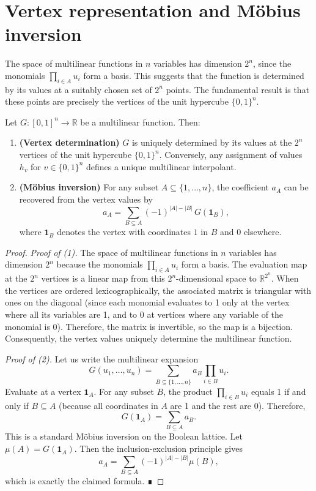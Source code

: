 \section{Vertex representation and Möbius inversion}
\label{sec:vertex-mobius}

The space of multilinear functions in \(n\) variables has dimension \(2^n\), since the monomials \(\prod_{i\in A} u_i\) form a basis. This suggests that the function is determined by its values at a suitably chosen set of \(2^n\) points. The fundamental result is that these points are precisely the vertices of the unit hypercube \(\{0,1\}^n\).

\begin{theorem}
\label{thm:vertex-mobius}
Let \(G:[0,1]^n\to\mathbb{R}\) be a multilinear function. Then:

\begin{enumerate}
    \item \textbf{(Vertex determination)} \(G\) is uniquely determined by its values at the \(2^n\) vertices of the unit hypercube \(\{0,1\}^n\). Conversely, any assignment of values \(h_v\) for \(v\in\{0,1\}^n\) defines a unique multilinear interpolant.
    \item \textbf{(Möbius inversion)} For any subset \(A\subseteq\{1,\ldots,n\}\), the coefficient \(a_A\) can be recovered from the vertex values by
    \[
    a_A = \sum_{B\subseteq A} (-1)^{|A|-|B|}\, G(\mathbf{1}_B),
    \]
    where \(\mathbf{1}_B\) denotes the vertex with coordinates \(1\) in \(B\) and \(0\) elsewhere.
\end{enumerate}
\end{theorem}

\begin{proof}
\textit{Proof of (1).} The space of multilinear functions in \(n\) variables has dimension \(2^n\) because the monomials \(\prod_{i\in A} u_i\) form a basis. The evaluation map at the \(2^n\) vertices is a linear map from this \(2^n\)-dimensional space to \(\mathbb{R}^{2^n}\). When the vertices are ordered lexicographically, the associated matrix is triangular with ones on the diagonal (since each monomial evaluates to 1 only at the vertex where all its variables are 1, and to 0 at vertices where any variable of the monomial is 0). Therefore, the matrix is invertible, so the map is a bijection. Consequently, the vertex values uniquely determine the multilinear function.

\textit{Proof of (2).} Let us write the multilinear expansion
\[
G(u_1,\ldots,u_n) = \sum_{B\subseteq\{1,\ldots,n\}} a_B \prod_{i\in B} u_i.
\]
Evaluate at a vertex \(\mathbf{1}_A\). For any subset \(B\), the product \(\prod_{i\in B} u_i\) equals 1 if and only if \(B\subseteq A\) (because all coordinates in \(A\) are 1 and the rest are 0). Therefore,
\[
G(\mathbf{1}_A) = \sum_{B\subseteq A} a_B.
\]
This is a standard Möbius inversion on the Boolean lattice. Let \(\mu(A) = G(\mathbf{1}_A)\). Then the inclusion-exclusion principle gives
\[
a_A = \sum_{B\subseteq A} (-1)^{|A|-|B|} \mu(B),
\]
which is exactly the claimed formula. ∎
\end{proof}

